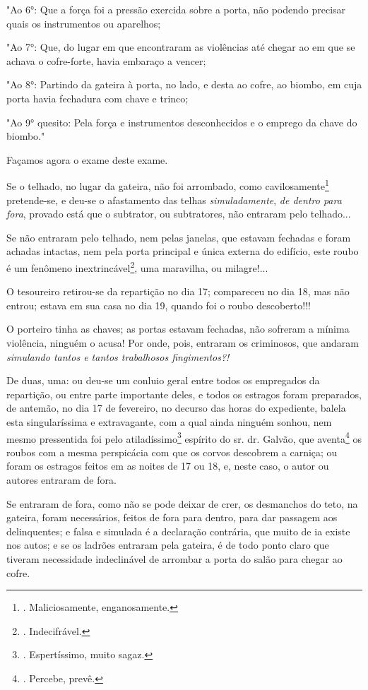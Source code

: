 "Ao 6°: Que a força foi a pressão exercida sobre a porta, não podendo
precisar quais os instrumentos ou aparelhos;

"Ao 7°: Que, do lugar em que encontraram as violências até chegar ao em
que se achava o cofre-forte, havia embaraço a vencer;

"Ao 8°: Partindo da gateira à porta, no lado, e desta ao cofre, ao
biombo, em cuja porta havia fechadura com chave e trinco;

"Ao 9° quesito: Pela força e instrumentos desconhecidos e o emprego da
chave do biombo."

Façamos agora o exame deste exame.

Se o telhado, no lugar da gateira, não foi arrombado, como
cavilosamente\footnote{. Maliciosamente, enganosamente.} pretende-se, e
deu-se o afastamento das telhas \emph{simuladamente}, \emph{de dentro
para fora}, provado está que o subtrator, ou subtratores, não entraram
pelo telhado...

Se não entraram pelo telhado, nem pelas janelas, que estavam fechadas e
foram achadas intactas, nem pela porta principal e única externa do
edifício, este roubo é um fenômeno inextrincável\footnote{.
  Indecifrável.}, uma maravilha, ou milagre!...

O tesoureiro retirou-se da repartição no dia 17; compareceu no dia 18,
mas não entrou; estava em sua casa no dia 19, quando foi o roubo
descoberto!!!

O porteiro tinha as chaves; as portas estavam fechadas, não sofreram a
mínima violência, ninguém o acusa! Por onde, pois, entraram os
criminosos, que andaram \emph{simulando tantos e tantos trabalhosos
fingimentos?!}

De duas, uma: ou deu-se um conluio geral entre todos os empregados da
repartição, ou entre parte importante deles, e todos os estragos foram
preparados, de antemão, no dia 17 de fevereiro, no decurso das horas do
expediente, balela esta singularíssima e extravagante, com a qual ainda
ninguém sonhou, nem mesmo pressentida foi pelo atiladíssimo\footnote{.
  Espertíssimo, muito sagaz.} espírito do sr. dr. Galvão, que
aventa\footnote{. Percebe, prevê.} os roubos com a mesma perspicácia com
que os corvos descobrem a carniça; ou foram os estragos feitos em as
noites de 17 ou 18, e, neste caso, o autor ou autores entraram de fora.

Se entraram de fora, como não se pode deixar de crer, os desmanchos do
teto, na gateira, foram necessários, feitos de fora para dentro, para
dar passagem aos delinquentes; e falsa e simulada é a declaração
contrária, que muito de ia existe nos autos; e se os ladrões entraram
pela gateira, é de todo ponto claro que tiveram necessidade indeclinável
de arrombar a porta do salão para chegar ao cofre.

